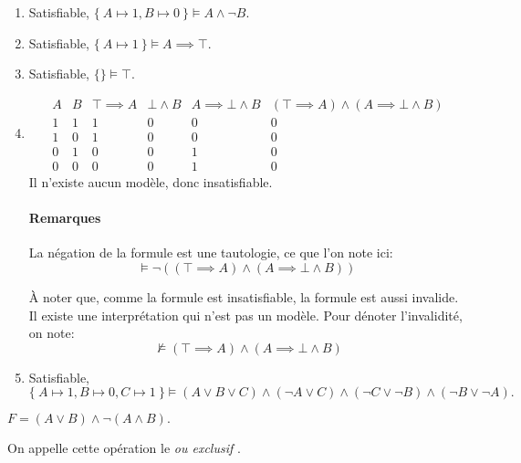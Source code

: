\documentclass[12pt,french,a4paper]{article}
\begin{document}
\begin{question}
\begin{enumerate}

\item Satisfiable, $\{\ A \mapsto 1, B \mapsto 0\ \} \vDash A \wedge \neg B.$
\item Satisfiable, $\{\ A \mapsto 1\ \} \vDash A \implies \top.$
\item Satisfiable, $\{ \} \vDash \top.$

\item\begin{displaymath}
\begin{array}{cc|cccc}
A & B & \top \implies A & \bot \wedge B &  A \implies \bot \wedge B &  (\top \implies A) \wedge( A \implies \bot \wedge B) \\
\hline
1 & 1 & 1 & 0 & 0 & 0\\
1 & 0 & 1 & 0 & 0 & 0\\
0 & 1 & 0 & 0 & 1 & 0\\
0 & 0 & 0 & 0 & 1 & 0
\end{array}
\end{displaymath}
Il n'existe aucun modèle, donc insatisfiable.

\paragraph{Remarques}
La négation de la formule est une tautologie, ce que l'on note ici:
\[
\vDash \neg ((\top \implies A) \wedge( A \implies \bot \wedge B))\
\]

À noter que, comme la formule est insatisfiable, la formule est aussi invalide. Il existe une interprétation qui n'est pas un modèle. Pour dénoter l'invalidité, on note:
\[\not \vDash (\top \implies A) \wedge( A \implies \bot \wedge B)\]

\item Satisfiable, $\{\ A \mapsto 1, B \mapsto 0, C \mapsto 1\ \} \vDash (A \vee B \vee C) \wedge (\neg A \vee C) \wedge (\neg C \vee \neg B) \wedge (\neg B \vee \neg A).$

\end{enumerate}
\end{question}

\begin{question}
$F = (A \vee B) \wedge \neg (A \wedge B).$

On appelle cette opération le \og \textit{ou exclusif} \fg{}.
\end{question}
\end{document}

